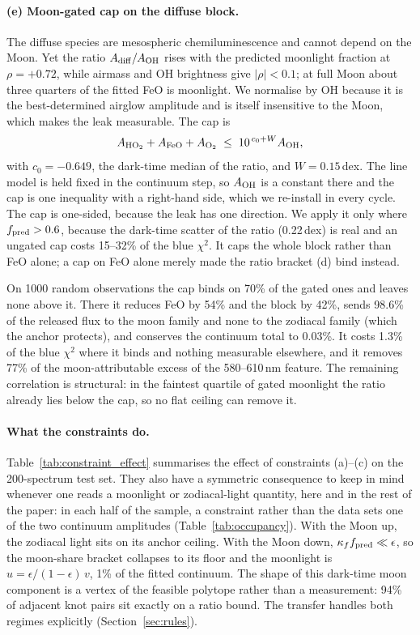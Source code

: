 \paragraph{(e) Moon-gated cap on the diffuse block.} The diffuse species are
mesospheric chemiluminescence and cannot depend on the Moon. Yet the ratio
$A_{\rm diff}/A_{\rm OH}$ rises with the predicted moonlight fraction at
$\rho = +0.72$, while airmass and OH brightness give $|\rho| < 0.1$; at full
Moon about three quarters of the fitted FeO is moonlight. We normalise by OH
because it is the best-determined airglow amplitude and is itself insensitive
to the Moon, which makes the leak measurable. The cap is
\begin{equation}
  A_{\rm HO_2} + A_{\rm FeO} + A_{\rm O_2} \;\le\; 10^{\,c_0 + W} A_{\rm OH},
\end{equation}
with $c_0 = -0.649$, the dark-time median of the ratio, and
$W = 0.15$\,dex. The line model is held fixed in the continuum step, so
$A_{\rm OH}$ is a constant there and the cap is one inequality with a
right-hand side, which we re-install in every cycle. The cap is one-sided,
because the leak has one direction. We apply it only where
$f_{\rm pred} > 0.6$, because the dark-time scatter of the ratio
(0.22\,dex) is real and an ungated cap costs 15--32\% of the blue $\chi^2$.
It caps the whole block rather than FeO alone; a cap on FeO alone merely
made the ratio bracket (d) bind instead.

On 1000 random observations the cap binds on 70\% of the gated ones and
leaves none above it. There it reduces FeO by 54\% and the block by 42\%,
sends 98.6\% of the released flux to the moon family and none to the
zodiacal family (which the anchor protects), and conserves the continuum
total to 0.03\%. It costs 1.3\% of the blue $\chi^2$ where it binds and
nothing measurable elsewhere, and it removes 77\% of the moon-attributable
excess of the 580--610\,nm feature. The remaining correlation is
structural: in the faintest quartile of gated moonlight the ratio already
lies below the cap, so no flat ceiling can remove it.

\paragraph{What the constraints do.} Table~\ref{tab:constraint_effect}
summarises the effect of constraints (a)--(c) on the 200-spectrum test set.
They also have a symmetric consequence to keep in mind whenever one reads a
moonlight or zodiacal-light quantity, here and in the rest of the paper: in
each half of the sample, a constraint rather than the data sets one of the
two continuum amplitudes (Table~\ref{tab:occupancy}). With the Moon up, the
zodiacal light sits on its anchor ceiling. With the Moon down,
$\kappa_f f_{\rm pred}\ll\epsilon$, so the moon-share bracket collapses to
its floor and the moonlight is $u = \epsilon/(1-\epsilon)\,v$, 1\% of the
fitted continuum. The shape of this dark-time moon component is a vertex of
the feasible polytope rather than a measurement: 94\% of adjacent knot pairs
sit exactly on a ratio bound. The transfer handles both regimes explicitly
(Section~\ref{sec:rules}).

